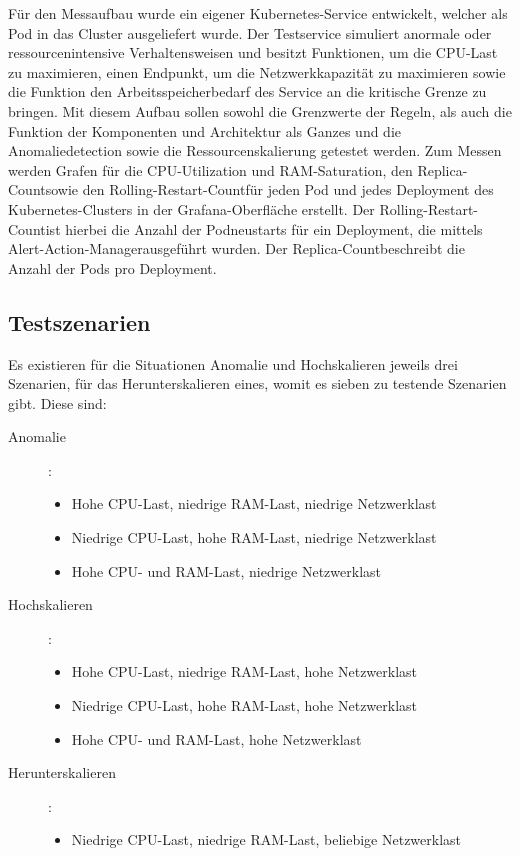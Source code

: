 \documentclass[a4paper,10pt]{scrartcl}
\begin{document}
Für den Messaufbau wurde ein eigener Kubernetes-Service entwickelt, welcher als Pod in das Cluster ausgeliefert wurde. Der Testservice simuliert anormale oder ressourcenintensive Verhaltensweisen und besitzt Funktionen, um die CPU-Last zu maximieren, einen Endpunkt, um die Netzwerkkapazität zu maximieren sowie die Funktion den Arbeitsspeicherbedarf des Service an die kritische Grenze zu bringen.
Mit diesem Aufbau sollen sowohl die Grenzwerte der Regeln, als auch die Funktion der Komponenten und Architektur als Ganzes und die Anomaliedetection sowie die Ressourcenskalierung getestet werden.
Zum Messen werden Grafen für die CPU-Utilization und RAM-Saturation, den \glqq Replica-Count\grqq sowie den \glqq Rolling-Restart-Count\grqq für jeden Pod und jedes Deployment des Kubernetes-Clusters in der Grafana-Oberfläche erstellt. Der \glqq Rolling-Restart-Count\grqq ist hierbei die Anzahl der Podneustarts für ein Deployment, die mittels \glqq Alert-Action-Manager\grqq ausgeführt wurden. Der \glqq Replica-Count\grqq beschreibt die Anzahl der Pods pro Deployment.

\subsection{Testszenarien}

Es existieren für die Situationen Anomalie und Hochskalieren jeweils drei Szenarien, für das Herunterskalieren eines, womit es sieben zu testende Szenarien gibt.
Diese sind:

\begin{description}
\item[Anomalie]:
\begin{itemize}
\item Hohe CPU-Last, niedrige RAM-Last, niedrige Netzwerklast
\item Niedrige CPU-Last, hohe RAM-Last, niedrige Netzwerklast
\item Hohe CPU- und RAM-Last, niedrige Netzwerklast
\end{itemize}
\item[Hochskalieren]:
\begin{itemize}
\item Hohe CPU-Last, niedrige RAM-Last, hohe Netzwerklast
\item Niedrige CPU-Last, hohe RAM-Last, hohe Netzwerklast
\item Hohe CPU- und RAM-Last, hohe Netzwerklast
\end{itemize}
\item[Herunterskalieren]:
\begin{itemize}
\item Niedrige CPU-Last, niedrige RAM-Last, beliebige Netzwerklast
\end{itemize}
\end{description}
\end{document}
